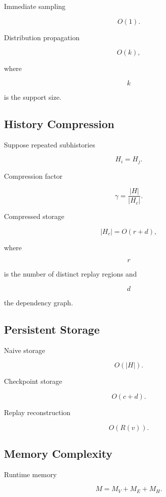 \documentclass[12pt,oneside]{article}
\theoremstyle{definition}
\theoremstyle{remark}
\begin{document}
Immediate sampling

\[
O(1).
\]

Distribution propagation

\[
O(k),
\]

where

\[
k
\]

is the support size.

\subsection*{History Compression}

Suppose repeated subhistories

\[
H_i
=
H_j.
\]

Compression factor

\[
\gamma
=
\frac{|H|}
{|H_c|}.
\]

Compressed storage

\[
|H_c|
=
O(r+d),
\]

where

\[
r
\]

is the number of distinct replay regions and

\[
d
\]

the dependency graph.

\subsection*{Persistent Storage}

Naive storage

\[
O(|H|).
\]

Checkpoint storage

\[
O(c+d).
\]

Replay reconstruction

\[
O(R(v)).
\]

\subsection*{Memory Complexity}

Runtime memory

\[
M
=
M_V
+
M_E
+
M_H.
\]
\end{document}
